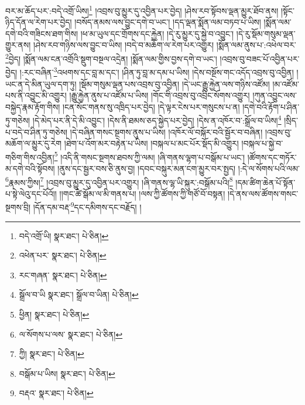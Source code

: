 བར་མ་ཆོད་པར་:བདེ་འགྲོ་ཡིས།\footnote{བདེ་འགྲོ་ཡི།  སྣར་ཐང་།  པེ་ཅིན། } །འབྲས་བུ་མྱུར་དུ་འབྱིན་པར་བྱེད། །ཤེས་རབ་སྟོབས་ལྡན་མྱུར་ཐོབ་ནས། །སྟོང་ཉིད་དོན་ལ་རེག་པར་བྱེད། །བསོད་ནམས་ལས་བྱུང་དགེ་བ་ཡང་། །དད་ལྡན་སྨོན་ལམ་བཏབ་པ་ཡིས། །སྨོན་ལམ་དགེ་བའི་གཟིངས་ཐག་གིས། །ཕ་མ་ཡུལ་དང་གྲོགས་དང་རྐྱེན། །དེ་རུ་མྱུར་དུ་སྐྱེ་བ་འབྱུང་། །དེ་རུ་སྡོམ་གསུམ་ལྡན་གྱུར་ནས། །ཤེས་རབ་གཉིས་ལས་བྱུང་བ་ཡིས། །བདེ་བ་མཆོག་ལ་རེག་པར་འགྱུར། །སྨོན་ལམ་ནུས་པ་:འཕེལ་བར་\footnote{འཕེན་པར་  སྣར་ཐང་།  པེ་ཅིན། }བྱེད། །སྨོན་ལམ་ངན་འགྲོའི་སྡུག་བསྔལ་འདྲེན། །སྨོན་ལམ་གྱིས་བྱས་དགེ་བ་ཡང་། །འབྲས་བུ་བཟང་པོ་འབྱིན་པར་བྱེད། །:རང་བཞིན་\footnote{རང་གཞན་  སྣར་ཐང་།  པེ་ཅིན། }འཕགས་དང་བླ་མ་དང་། །ཤིན་ཏུ་བླ་མ་དམ་པ་ཡིས། །དེས་བསྔོས་གང་འདོད་འབྲས་བུ་འབྱིན། །ཡང་ན་དེ་མིན་ཡུལ་དག་ཏུ། །སྡོམ་གསུམ་ལྡན་པས་འབྲས་བུ་འབྱིན། །དེ་ཡང་རྒྱུ་རྐྱེན་ལས་གཉིས་འཛོམ། །མ་འཛོམ་པས་ནི་འབྱུང་མི་འགྱུར། །རྒྱུ་རྐྱེན་ནུས་པ་འཛོམ་པ་ཡིས། །གོང་གི་འབྲས་བུ་འབྲིང་སོགས་འགྱུར། །ཀུན་འབྱུང་ལས་བསྐྱེད་རྣམ་རྟོག་གིས། །ངན་སོང་གནས་སུ་འཁྲིད་པར་བྱེད། །དེ་ལྟར་ངེས་པར་གསུངས་པ་ན། །དགེ་བའི་རྟོག་པ་ཤིན་ཏུ་གཅེས། །དེ་མེད་པར་ནི་དེ་མི་འབྱུང་། །དེས་ནི་ཐམས་ཅད་སྐྱེད་པར་བྱེད། །དེས་ན་འཁོར་བ་:སྒྲོལ་བ་ཡིས།\footnote{སྒྲོལ་བ་ཡི  སྣར་ཐང་། སྒྲོལ་བ་ཡིན།  པེ་ཅིན། } །སྲིད་པ་བདེ་བ་ཤིན་ཏུ་གཅེས། །དེ་བཞིན་གསང་སྔགས་ནུས་པ་ཡིས། །འཁོར་ལོ་བསྐོར་བའི་སྦྱོར་བ་བཞིན། །འབྲས་བུ་མཆོག་ལ་མྱུར་དུ་རེག །ཐེག་པ་འོག་མར་བརྟེན་པ་ཡིས། །བསྐལ་པ་མང་པོར་སྡོད་མི་འགྱུར། །བསྐལ་པ་སྐྱེ་བ་གཅིག་གིས་འབྱིན།\footnote{ཕྱིན།  སྣར་ཐང་།  པེ་ཅིན། } །འདི་ནི་གསང་སྔགས་ཐབས་ཀྱི་ལམ། །ཞི་གནས་ལྷག་པ་བསྒོམ་པ་ཡང་། །ཚོགས་དང་གཏོར་མ་དགེ་བའི་སྟོབས། །ནུས་དང་སྦྱར་བས་ཅི་ནུས་བྱ། །དབང་བསྐུར་མན་ངག་མྱུར་བར་སྤྱད། །:དེ་ལ་སོགས་པའི་ལམ་\footnote{ལ་སོགས་པ་ལས་  སྣར་ཐང་།  པེ་ཅིན། }རྣམས་ཀྱིས།\footnote{ཀྱི།  སྣར་ཐང་།  པེ་ཅིན། } །འབྲས་བུ་མྱུར་དུ་འབྱིན་པར་འགྱུར། །ཞི་གནས་ལྷ་ཡི་སྐུར་:བསྒོམ་པའི།\footnote{བསྒོམ་པ་ཡིས།  སྣར་ཐང་།  པེ་ཅིན། } །དམ་ཚིག་ཆེན་པོ་སྟོན་པ་སྟེ་ལེའུ་དང་པོའོ།། །།གང་ཚེ་སྒོམ་ལ་མི་གནས་པ། །ལས་ཀྱི་ཚོགས་ཀྱི་གཙོ་བོ་བསྟན། །དེ་ནས་ལས་ཚོགས་གསང་སྔགས་བྲི། །དོན་དམ་བརྡ་\footnote{བརྡའ་  སྣར་ཐང་།  པེ་ཅིན། }དང་དམིགས་དང་བརྗོད། །
